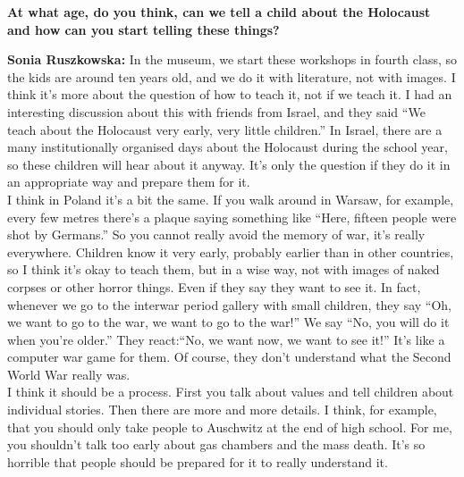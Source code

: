 \textbf{At what age, do you think, can we tell a child about the Holocaust and how can you start telling these things?} 

\textbf{Sonia Ruszkowska:} In the museum, we start these workshops in fourth class, so the kids are around ten years old, and we do it with literature, not with images. I think it’s more about the question of how to teach it, not if we teach it. I had an interesting discussion about this with friends from Israel, and they said ``We teach about the Holocaust very early, very little children.'' In Israel, there are a many institutionally organised days about the Holocaust during the school year, so these children will hear about it anyway. It’s only the question if they do it in an appropriate way and prepare them for it.\\ 
I think in Poland it’s a bit the same. If you walk around in Warsaw, for example, every few metres there’s a plaque saying something like ``Here, fifteen people were shot by Germans.'' So you cannot really avoid the memory of war, it’s really everywhere. Children know it very early, probably earlier than in other countries, so I think it’s okay to teach them, but in a wise way, not with images of naked corpses or other horror things. Even if they say they want to see it. In fact, whenever we go to the interwar period gallery with small children, they say ``Oh, we want to go to the war, we want to go to the war!'' We say ``No, you will do it when you’re older.'' They react:``No, we want now, we want to see it!'' It’s like a computer war game for them. Of course, they don’t understand what the Second World War really was.\\ 
I think it should be a process. First you talk about values and tell children about individual stories. Then there are more and more details. I think, for example, that you should only take people to Auschwitz at the end of high school. For me, you shouldn’t talk too early about gas chambers and the mass death. It’s so horrible that people should be prepared for it to really understand it.  